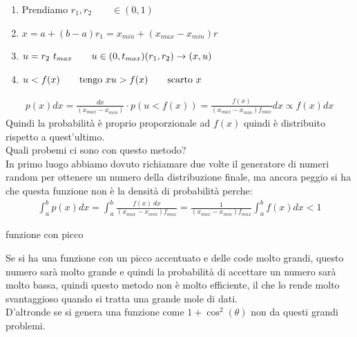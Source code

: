 \documentclass[a4paper, oneside]{article}
\begin{document}
\begin{enumerate}
    \item Prendiamo $r_1 ,r_2 \qquad \in(0,1)$
    \item $x = a + (b-a) r_1 = x_{min} + (x_{max} - x_{min}) r$
    \item $u = r_2 \ t_{max} \qquad u \in(0,t_{max}) \\ (r_1 , r_2) \to (x,u)$
    \item $u < f(x) \qquad \text{tengo } x \\ u > f(x) \qquad \text{scarto } x$
\end{enumerate}
\begin{gather*}
    p(x) dx = \frac{dx}{(x_{max} - x_{min})} \cdot p(u < f(x)) = \frac{f(x)}{(x_{max} - x_{min}) f_{max}} dx \propto f(x) dx
\end{gather*}
Quindi la probabilità è proprio proporzionale ad $f(x)$ quindi è distribuito rispetto a quest'ultimo.\\
Quali probemi ci sono con questo metodo?\\
In primo luogo abbiamo dovuto richiamare due volte il generatore di numeri random per ottenere un numero della distribuzione finale, ma ancora peggio si ha che questa funzione non è la densità di probabilità perche:
\begin{gather*}
    \int_a^b p(x) dx = \int_a^b \frac{f(x) \ dx}{(x_{max} - x_{min}) f_{max}} = \frac{1}{(x_{max} - x_{min}) f_{max}} \int_a^b f(x) dx < 1
\end{gather*}
\begin{center}
    funzione con picco
\end{center}
Se si ha una funzione con un picco accentuato e delle code molto grandi, questo numero sarà molto grande e quindi la probabilità di accettare un numero sarà molto bassa, quindi questo metodo non è molto efficiente, il che lo rende molto svantaggioso quando si tratta una grande mole di dati.\\
D'altronde se si genera una funzione come $1 + \cos^2(\theta)$ non da questi grandi problemi.
\begin{center}
\end{center}
\end{document}
